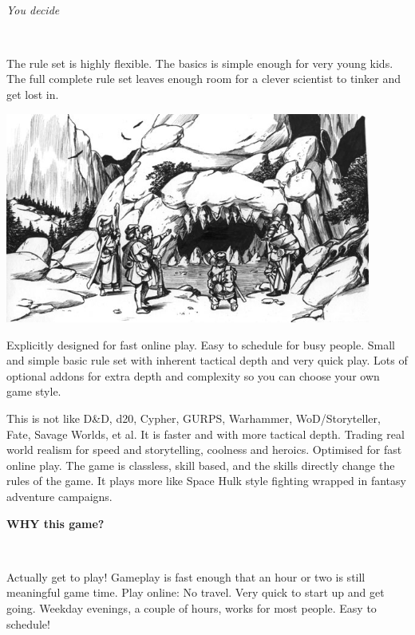 \

\emph{You decide}

\

\noindent
The rule set is highly flexible. The basics is simple enough for very young kids. The full complete rule set leaves enough room for a clever scientist to tinker and get lost in.




\vfill

\begin{center}
\includegraphics[width=120mm]{./fig/cavemouth.jpg}
\end{center}

\vfill




\noindent
Explicitly designed for fast online play. Easy to schedule for busy people. Small and simple basic rule set with inherent tactical depth and very quick play. Lots of optional addons for extra depth and complexity so you can choose your own game style.

This is not like D\&D, d20, Cypher, GURPS, Warhammer, WoD/Storyteller, Fate, Savage Worlds, et al. It is faster and with more tactical depth. Trading real world realism for speed and storytelling, coolness and heroics. Optimised for fast online play. The game is classless, skill based, and the skills directly change the rules of the game. It plays more like Space Hulk style fighting wrapped in fantasy adventure campaigns.







\clearpage %

\noindent
\textbf{WHY \hfill this \hfill game?}

\

\noindent
Actually get to play! Gameplay is fast enough that an hour or two is still meaningful game time. Play online: No travel. Very quick to start up and get going. Weekday evenings, a couple of hours, works for most people. Easy to schedule!


